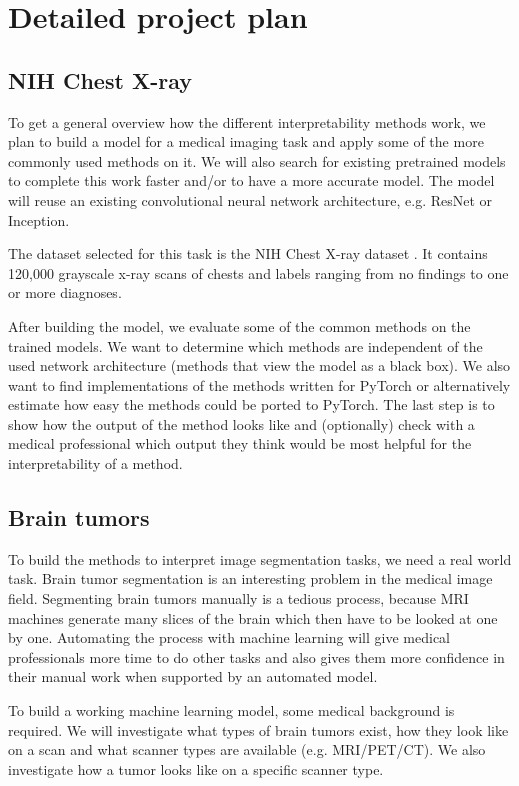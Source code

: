 \section{Detailed project plan}
\subsection{NIH Chest X-ray}
To get a general overview how the different interpretability methods work, we plan to build a model for a medical imaging task and apply some of the more commonly used methods on it. We will also search for existing pretrained models to complete this work faster and/or to have a more accurate model. The model will reuse an existing convolutional neural network architecture, e.g. ResNet or Inception.

The dataset selected for this task is the NIH Chest X-ray dataset \cite{wang2017chestx}. It contains 120,000 grayscale x-ray scans of chests and labels ranging from no findings to one or more diagnoses.

After building the model, we evaluate some of the common methods on the trained models. We want to determine which methods are independent of the used network architecture (methods that view the model as a black box). We also want to find implementations of the methods written for PyTorch or alternatively estimate how easy the methods could be ported to PyTorch. The last step is to show how the output of the method looks like and (optionally) check with a medical professional which output they think would be most helpful for the interpretability of a method.

\subsection{Brain tumors}
To build the methods to interpret image segmentation tasks, we need a real world task. Brain tumor segmentation is an interesting problem in the medical image field. Segmenting brain tumors manually is a tedious process, because MRI machines generate many slices of the brain which then have to be looked at one by one. Automating the process with machine learning will give medical professionals more time to do other tasks and also gives them more confidence in their manual work when supported by an automated model.

To build a working machine learning model, some medical background is required. We will investigate what types of brain tumors exist, how they look like on a scan and what scanner types are available (e.g. MRI/PET/CT). We also investigate how a tumor looks like on a specific scanner type.

